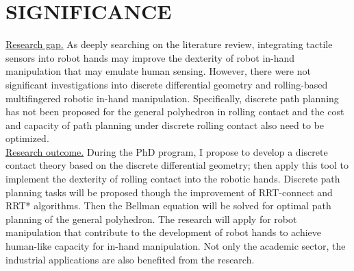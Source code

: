 

\section{SIGNIFICANCE}
\noindent\uline{Research gap.}
As deeply searching on the literature review, integrating tactile sensors into robot hands may improve the dexterity of robot in-hand manipulation \cite{Lei14_Teleoperation_ThumbRobotHand} \cite{Bagnell12_IntegratedSystem_AutonomousRoboticsManipulation} that may emulate human sensing.
However, there were not significant investigations into discrete differential geometry and rolling-based multifingered robotic in-hand manipulation. Specifically, discrete path planning has not been proposed for the general polyhedron in rolling contact and the cost and capacity of path planning under discrete rolling contact also need to be optimized.\\

\noindent\uline{Research outcome.}
During the PhD program, I propose to develop a discrete contact theory based on the discrete differential geometry; then apply this tool to implement the dexterity of rolling contact into the robotic hands. 
Discrete path planning tasks will be proposed though the improvement of RRT-connect and RRT* algorithms. Then the Bellman equation will be solved for optimal path planning of the general polyhedron.
The research will apply for robot manipulation that contribute to the development of robot hands to achieve human-like capacity for in-hand manipulation. Not only the academic sector, the industrial applications are also benefited from the research. 



